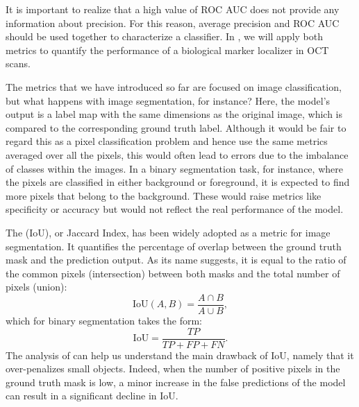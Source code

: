 It is important to realize that a high value of ROC AUC does not provide any information about precision. For this reason, average precision and ROC AUC should be used together to characterize a classifier. In , we will apply both metrics to quantify the performance of a biological marker localizer in OCT scans.

The metrics that we have introduced so far are focused on image classification, but what happens with image segmentation, for instance? Here, the model's output is a label map with the same dimensions as the original image, which is compared to the corresponding ground truth label. Although it would be fair to regard this as a pixel classification problem and hence use the same metrics averaged over all the pixels, this would often lead to errors due to the imbalance of classes within the images. In a binary segmentation task, for instance, where the pixels are classified in either background or foreground, it is expected to find more pixels that belong to the background. These would raise metrics like specificity or accuracy but would not reflect the real performance of the model.

The \textit{} (IoU), or Jaccard Index, has been widely adopted as a metric for image segmentation. It quantifies the percentage of overlap between the ground truth mask and the prediction output. As its name suggests, it is equal to the ratio of the common pixels (intersection) between both masks and the total number of pixels (union):
\begin{equation*}
    \text{IoU}(A,B) = \dfrac{A\cap B}{A \cup B},
\end{equation*}
which for binary segmentation takes the form:
\begin{equation}
    \text{IoU} = \dfrac{TP}{TP + FP + FN}.
    \label{eq:iou}
\end{equation}
The analysis of  can help us understand the main drawback of IoU, namely that it over-penalizes small objects. Indeed, when the number of positive pixels in the ground truth mask is low, a minor increase in the false predictions of the model can result in a significant decline in IoU.
 
